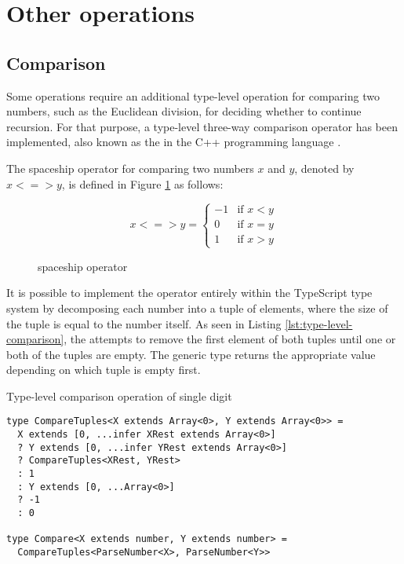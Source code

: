 \section{Other operations}

\subsection{Comparison}

Some operations require an additional type-level operation for comparing two numbers, such as the Euclidean division, for deciding whether to continue recursion. For that purpose, a type-level three-way comparison operator has been implemented, also known as the  in the C++ programming language \cite{sutterConsistentComparison2017}.

The spaceship operator for comparing two numbers $x$ and $y$, denoted by $x <=> y$, is defined in Figure \ref{fig:spaceship-operator} as follows:

\begin{figure}[ht]
  \begin{equation*}
    x <=> y =
    \begin{cases}
      -1 & \text{if } x < y \\
      0  & \text{if } x = y \\
      1  & \text{if } x > y
    \end{cases}
  \end{equation*}
  \caption{spaceship operator}\label{fig:spaceship-operator}
\end{figure}

It is possible to implement the operator entirely within the TypeScript type system by decomposing each number into a tuple of elements, where the size of the tuple is equal to the number itself. As seen in Listing \ref{lst:type-level-comparison}, the  attempts to remove the first element of both tuples until one or both of the tuples are empty. The generic type returns the appropriate value depending on which tuple is empty first.

\begin{listing}[ht]
  \caption{Type-level comparison operation of single digit}\label{lst:type-level-comparison}
  \begin{verbatim}
type CompareTuples<X extends Array<0>, Y extends Array<0>> =
  X extends [0, ...infer XRest extends Array<0>]
  ? Y extends [0, ...infer YRest extends Array<0>]
  ? CompareTuples<XRest, YRest>
  : 1
  : Y extends [0, ...Array<0>]
  ? -1
  : 0

type Compare<X extends number, Y extends number> =
  CompareTuples<ParseNumber<X>, ParseNumber<Y>>
\end{verbatim}
\end{listing}


